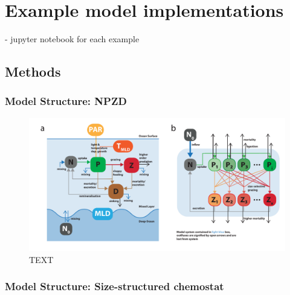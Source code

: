 \documentclass[journal abbreviation, manuscript]{copernicus}
\begin{document}
\section{Example model implementations}
- jupyter notebook for each example

\subsection{Methods}

\subsubsection{Model Structure: NPZD}

\begin{figure}[t]
\includegraphics[width=15cm]{Figures/firstdraft_schematics/02__schematics_NPZDandChemostat.pdf}
\caption{TEXT}
\label{phydraschematics_1}
\end{figure}

\subsubsection{Model Structure: Size-structured chemostat}
\end{document}
